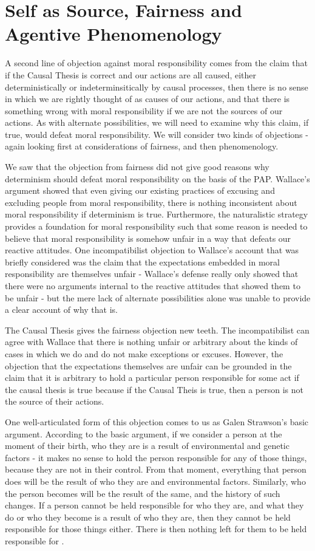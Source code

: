 \documentclass[phd,12pt,oneside,paper=letterpaper]{ubcthesis}
\begin{document}
\section{Self as Source, Fairness and Agentive Phenomenology}
A second line of objection against moral responsibility comes from the claim that if the Causal Thesis is correct and our actions are all caused, either deterministically or indeterminsitically by causal processes, then there is no sense in which we are rightly thought of as causes of our actions, and that there is something wrong with moral responsibility if we are not the sources of our actions. As with alternate possibilities, we will need to examine why this claim, if true, would defeat moral responsibility. We will consider two kinds of objections - again looking first at considerations of fairness, and then phenomenology.

We saw that the objection from fairness did not give good reasons why determinism should defeat moral responsibility on the basis of the PAP. Wallace's argument showed that even giving our existing practices of excusing and excluding people from moral responsibility, there is nothing inconsistent about moral responsibility if determinism is true. Furthermore, the naturalistic strategy provides a foundation for moral responsibility such that some reason is needed to believe that moral responsibility is somehow unfair in a way that defeats our reactive attitudes. One incompatibilist objection to Wallace's account that was briefly considered was the claim that the expectations embedded in moral responsibility are themselves unfair - Wallace's defense really only showed that there were no arguments internal to the reactive attitudes that showed them to be unfair - but the mere lack of alternate possibilities alone was unable to provide a clear account of why that is.

The Causal Thesis gives the fairness objection new teeth. The incompatibilist can agree with Wallace that there is nothing unfair or arbitrary about the kinds of cases in which we do and do not make exceptions or excuses. However, the objection that the expectations themselves are unfair can be grounded in the claim that it is arbitrary to hold a particular person responsible for some act if the causal thesis is true because if the Causal Theis is true, then  a person is not the source of their actions. 

One well-articulated form of this objection comes to us as Galen Strawson's \citeyearpar{strawsong2010} basic argument. According to the basic argument, if we consider a person at the moment of their birth, who they are is a result of environmental and genetic factors - it makes no sense to hold the person responsible for any of those things, because they are not in their control. From that moment, everything that person does will be the result of who they are and environmental factors. Similarly, who the person becomes will be the result of the same, and the history of such changes. If a person cannot be held responsible for who they are, and what they do or who they become is a result of who they are, then they cannot be held responsible for those things either. There is then nothing left for them to be held responsible for \citep[p24-7]{strawsong2010}.
\end{document}

